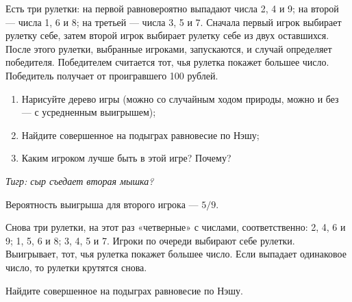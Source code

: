 \begin{problem}[Рулетки {[О]}]\par
\begin{source} \cite[2.6.23]{binmore:fg} \end{source}
Есть три рулетки: на первой равновероятно выпадают числа 2, 4 и 9; на второй — числа 1, 6 и 8; на третьей — числа 3, 5 и 7. Сначала первый игрок выбирает рулетку себе, затем второй игрок выбирает рулетку себе из двух оставшихся. После этого рулетки, выбранные игроками, запускаются, и случай определяет победителя. Победителем считается тот, чья рулетка покажет большее число. Победитель получает от проигравшего 100 рублей.\par
\begin{enumerate}
\item Нарисуйте дерево игры (можно со случайным ходом природы, можно и без — с усредненным выигрышем);
\item Найдите совершенное на подыграх равновесие по Нэшу;
\item Каким игроком лучше быть в этой игре? Почему?
\end{enumerate}
{\it Тигр: сыр съедает вторая мышка?}



\begin{sol}
Вероятность выигрыша для второго игрока — $5/9$.
\end{sol}
\end{problem}



\begin{problem}[Рулетки]\par
\begin{source} \cite[2.6.25]{binmore:fg} \end{source}
Снова три рулетки, на этот раз «четверные» с числами, соответственно: 2, 4, 6 и 9; 1, 5, 6 и 8; 3, 4, 5 и 7. Игроки по очереди выбирают себе рулетки. Выигрывает, тот, чья рулетка покажет большее число. Если выпадает одинаковое число, то рулетки крутятся снова.\par
Найдите совершенное на подыграх равновесие по Нэшу.

\begin{sol}

\end{sol}
\end{problem}



